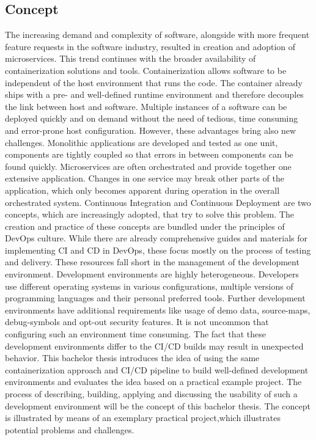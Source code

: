 \documentclass[12pt, a4paper]{article}
\begin{document}
\subsection{Concept}
The increasing demand and complexity of software, alongside with more frequent feature requests in the software industry, resulted in creation and adoption of microservices. This trend continues with the broader availability of containerization solutions and tools. Containerization allows software to be independent of the host environment that runs the code. The container already ships with a pre- and well-defined runtime environment and therefore decouples the link between host and software. Multiple instances of a software can be deployed quickly and on demand without the need of tedious, time consuming and error-prone host configuration. However, these advantages bring also new challenges. Monolithic applications are developed and tested as one unit, components are tightly coupled so that errors in between components can be found quickly. Microservices are often orchestrated and provide together one extensive application. Changes in one service may break other parts of the application, which only becomes apparent during operation in the overall orchestrated system. Continuous Integration and Continuous Deployment are two concepts, which are increasingly adopted, that try to solve this problem. The creation and practice of these concepts are bundled under the principles of DevOps culture. While there are already comprehensive guides and materials for implementing \ac{CI} and \ac{CD} in DevOps, these focus mostly on the process of testing and delivery. These resources fall short in the management of the development environment.\newline
Development environments are highly heterogeneous. Developers use different operating systems in various configurations, multiple versions of programming languages and their personal preferred tools. Further development environments have additional requirements like usage of demo data, source-maps, debug-symbols and opt-out security features. It is not uncommon that configuring such an environment time consuming. The fact that these development environments differ to the \ac{CI}/\ac{CD} builds may result in unexpected behavior. This bachelor thesis introduces the idea of using the same containerization approach and \ac{CI}/\ac{CD} pipeline to build well-defined development environments and evaluates the idea based on a practical example project.\newline
The process of describing, building, applying and discussing the usability of such a development environment will be the concept of this bachelor thesis. The concept is illustrated by means of an exemplary practical project,which illustrates potential problems and challenges.
\end{document}
